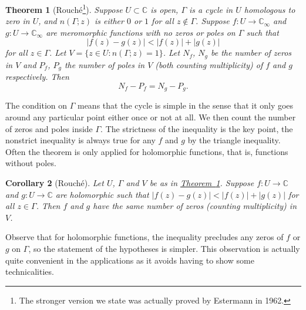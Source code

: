 \documentclass[12pt,openany]{book}
\newcommand{\sabs}[1]{\lvert {#1} \rvert}
\newcommand{\C}{{\mathbb{C}}}
\theoremstyle{plain}
\newtheorem{thm}{Theorem}[section]
\newtheorem{cor}[thm]{Corollary}
\theoremstyle{remark}
\theoremstyle{definition}
\theoremstyle{exercise}
\theoremstyle{example}
\newcommand{\thmref}[1]{\hyperref[#1]{Theorem~\ref*{#1}}}
\begin{document}
\begin{thm}[Rouch\'e\footnote{%
The stronger version we state was actually proved by Estermann in 1962.}]\label{thm:rouche}
\pagebreak[2]
Suppose $U \subset \C$ is open, $\Gamma$ is a cycle
in $U$ homologous to zero in $U$,
and $n(\Gamma;z)$ is either $0$ or $1$ for all $z \notin \Gamma$.
Suppose $f \colon U \to \C_\infty$ and $g \colon U \to \C_\infty$
are meromorphic functions with no zeros or poles on
$\Gamma$ such that
\begin{equation*}
\sabs{f(z)-g(z)} < \sabs{f(z)}+\sabs{g(z)}
\end{equation*}
for all $z \in \Gamma$.
Let $V = \bigl\{ z \in U : n(\Gamma;z) = 1 \bigr\}$.
Let $N_f$, $N_g$ be the number of zeros in $V$
and $P_f$, $P_g$ the number of poles in $V$ (both counting multiplicity)
of $f$ and $g$ respectively.
Then
\begin{equation*}
N_f - P_f = 
N_g - P_g.
\end{equation*}
\end{thm}

The condition on $\Gamma$ means that the
cycle is simple in the sense
that it only goes around any particular point either once or not at all.
We then count the number of zeros and poles inside $\Gamma$.
The strictness of the inequality is the key point,
the nonstrict inequality is always true for any $f$ and $g$ by the triangle
inequality.
Often the theorem is only applied for holomorphic functions, that is,
functions without poles.

\begin{cor}[Rouch\'e]\label{thm:rouche2}
Let $U$, $\Gamma$ and $V$ be as in \thmref{thm:rouche}.
Suppose $f \colon U \to \C$ and $g \colon U \to \C$
are holomorphic such that
$\sabs{f(z)-g(z)} < \sabs{f(z)}+\sabs{g(z)}$
for all $z \in \Gamma$.  Then $f$ and $g$ have the same number of zeros
(counting multiplicity) in $V$.
\end{cor}

Observe that for holomorphic functions,
the inequality precludes any zeros of $f$ or
$g$ on $\Gamma$, so the statement of the hypotheses is simpler.
This observation is actually quite convenient in the
applications as it avoids having to show some technicalities.
\end{document}
